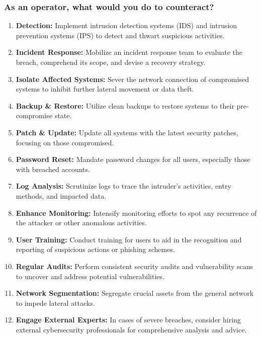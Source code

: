 \subsubsection{As an operator, what would you do to counteract?}
\begin{enumerate}
      \item \textbf{Detection:}
            Implement intrusion detection systems (IDS) and intrusion prevention systems (IPS) to detect and thwart suspicious activities.

      \item \textbf{Incident Response:}
            Mobilize an incident response team to evaluate the breach, comprehend its scope, and devise a recovery strategy.

      \item \textbf{Isolate Affected Systems:}
            Sever the network connection of compromised systems to inhibit further lateral movement or data theft.

      \item \textbf{Backup \& Restore:}
            Utilize clean backups to restore systems to their pre-compromise state.

      \item \textbf{Patch \& Update:}
            Update all systems with the latest security patches, focusing on those compromised.

      \item \textbf{Password Reset:}
            Mandate password changes for all users, especially those with breached accounts.

      \item \textbf{Log Analysis:}
            Scrutinize logs to trace the intruder's activities, entry methods, and impacted data.

      \item \textbf{Enhance Monitoring:}
            Intensify monitoring efforts to spot any recurrence of the attacker or other anomalous activities.

      \item \textbf{User Training:}
            Conduct training for users to aid in the recognition and reporting of suspicious actions or phishing schemes.

      \item \textbf{Regular Audits:}
            Perform consistent security audits and vulnerability scans to uncover and address potential vulnerabilities.

      \item \textbf{Network Segmentation:}
            Segregate crucial assets from the general network to impede lateral attacks.

      \item \textbf{Engage External Experts:}
            In cases of severe breaches, consider hiring external cybersecurity professionals for comprehensive analysis and advice.
\end{enumerate}



